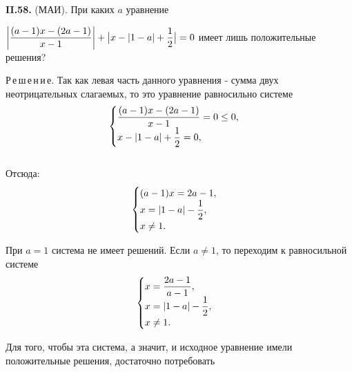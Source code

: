 \documentclass{article}
\begin{document}
\textbf{II.58.} (МАИ). При каких $a$ уравнение
 
$\displaystyle    \bigg|{{(a - 1)x - (2a - 1)}\over{x - 1}}\bigg|  + \big|x - |1 - a|   + {{1}\over{2}}\big| = 0$  
имеет лишь положительные решения?
 
Р\,е\,ш\,е\,н\,и\,е. Так как левая часть данного уравнения  - сумма двух неотрицательных слагаемых, то это уравнение равносильно системе
 \begin{equation*}
 \begin{cases}
  \displaystyle {{(a - 1)x - (2a - 1)}\over{x - 1}} = 0 \leq 0, 
   \\
  \displaystyle  x - |1 - a| + {{1}\over{2}} = 0,
 \end{cases}
\end{equation*}
\\
Отсюда:
 \begin{equation*}
 \begin{cases}
  \displaystyle (a - 1)x = 2a - 1, 
   \\
  \displaystyle  x = |1 - a| - {{1}\over{2}},
  \\
  x \ne 1.
 \end{cases}
\end{equation*}
 
При $a = 1$ система не имеет решений. Если $a \ne 1$, то переходим к равносильной системе
 \begin{equation*}
 \begin{cases}
  \displaystyle x = {{2a - 1}\over{a - 1}}, 
   \\
  \displaystyle  x  = |1 - a| - {{1}\over{2}},
  \\
  x \ne 1.
 \end{cases}
\end{equation*}
 
Для того, чтобы эта система, а значит, и исходное уравнение имели положительные решения, достаточно потребовать
 
 
  
  
\end{document}
